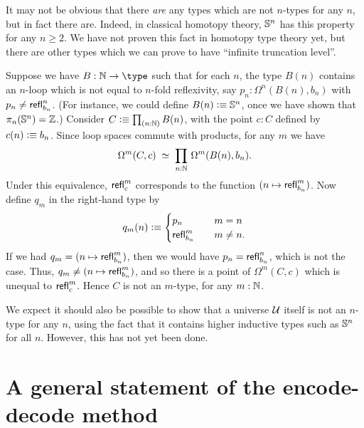 %
%

It may not be obvious that there \emph{are} any types which are not $n$-types for any $n$, but in fact there are.
Indeed, in classical homotopy theory, $\mathbb{S}^n$ has this property for any $n\ge 2$.
We have not proven this fact in homotopy type theory yet, but there are other types which we can prove to have ``infinite truncation level''.

\begin{eg}
  Suppose we have $B:\nat\to\type$ such that for each $n$, the type $B(n)$ contains an $n$-loop which is not equal to $n$-fold reflexivity, say $p_n:\Omega^n(B(n),b_n)$ with $p_n \neq \mathsf{refl}_{b_n}^n$.
  (For instance, we could define $B(n)\vcentcolon\equiv \mathbb{S}^n$, once we have shown that $\pi_n(\mathbb{S}^n)=\mathbb{Z}$.)
  Consider $C\defeq \prd{n:\nat} B(n)$, with the point $c:C$ defined by $c(n)\vcentcolon\equiv b_n$.
  Since loop spaces commute with products, for any $m$ we have
  \[\eqvspaced{\Omega^m (C,c)}{\prd{n:\nat}\Omega^m(B(n),b_n)}.\]
  Under this equivalence, $\mathsf{refl}_{c}^m$ corresponds to the function $(n\mapsto \mathsf{refl}_{b_n}^m)$.
  Now define $q_m$ in the right-hand type by
  \[ q_m(n) \vcentcolon\equiv
  \begin{cases}
    p_n &\quad m=n\\
    \mathsf{refl}_{b_n}^m &\quad m\neq n.
  \end{cases}
  \]
  If we had $q_m = (n\mapsto \mathsf{refl}_{b_n}^m)$, then we would have $p_n = \mathsf{refl}_{b_n}^n$, which is not the case.
  Thus, $q_m \neq (n\mapsto \mathsf{refl}_{b_n}^m)$, and so there is a point of $\Omega^m(C,c)$ which is unequal to $\mathsf{refl}_{c}^m$.
  Hence $C$ is not an $m$-type, for any $m:\mathbb{N}$.
\end{eg}

We expect it should also be possible to show that a universe $\mathcal{U}$ itself is not an $n$-type for any $n$, using the fact that it contains higher inductive types such as $\mathbb{S}^n$ for all $n$.
However, this has not yet been done.

\section{A general statement of the encode-decode method}
\label{sec:general-encode-decode}


